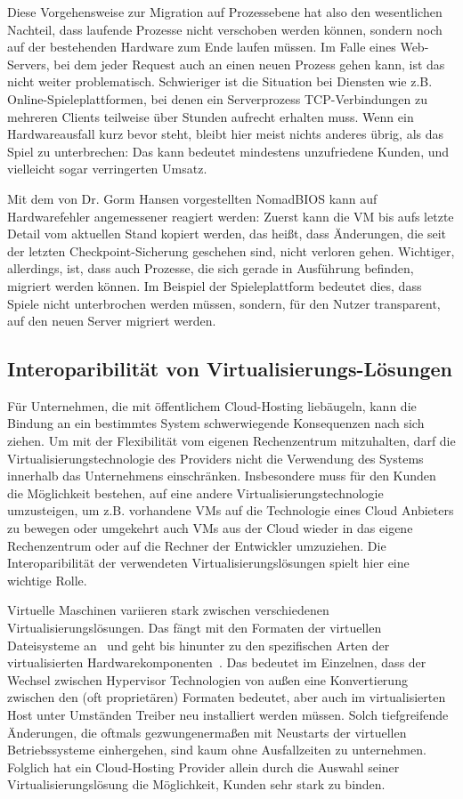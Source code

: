 Diese Vorgehensweise zur Migration auf Prozessebene hat also den
wesentlichen Nachteil, dass laufende Prozesse nicht verschoben werden
können, sondern noch auf der bestehenden Hardware zum Ende laufen
müssen. Im Falle eines Web-Servers, bei dem jeder Request auch an
einen neuen Prozess gehen kann, ist das nicht weiter
problematisch. Schwieriger ist die Situation bei Diensten wie
z.B. Online-Spieleplattformen, bei denen ein Serverprozess
TCP-Verbindungen zu mehreren Clients teilweise über Stunden aufrecht
erhalten muss. Wenn ein Hardwareausfall kurz bevor steht, bleibt hier
meist nichts anderes übrig, als das Spiel zu unterbrechen: Das kann
bedeutet mindestens unzufriedene Kunden, und vielleicht sogar
verringerten Umsatz.

Mit dem von Dr. Gorm Hansen vorgestellten NomadBIOS kann auf Hardwarefehler
angemessener reagiert werden: Zuerst kann die VM bis aufs letzte
Detail vom aktuellen Stand kopiert werden, das heißt, dass Änderungen,
die seit der letzten Checkpoint-Sicherung geschehen sind, nicht
verloren gehen. Wichtiger, allerdings, ist, dass auch Prozesse, die
sich gerade in Ausführung befinden, migriert werden können. Im
Beispiel der Spieleplattform bedeutet dies, dass Spiele nicht
unterbrochen werden müssen, sondern, für den Nutzer transparent, auf
den neuen Server migriert werden.

\subsection{Interoparibilität von Virtualisierungs-Lösungen}
Für Unternehmen, die mit öffentlichem Cloud-Hosting liebäugeln, kann
die Bindung an ein bestimmtes System schwerwiegende Konsequenzen nach
sich ziehen. Um mit der Flexibilität vom eigenen Rechenzentrum
mitzuhalten, darf die Virtualisierungstechnologie des Providers nicht
die Verwendung des Systems innerhalb das Unternehmens
einschränken. Insbesondere muss für den Kunden die Möglichkeit
bestehen, auf eine andere Virtualisierungstechnologie umzusteigen, um
z.B. vorhandene VMs auf die Technologie eines Cloud Anbieters zu
bewegen oder umgekehrt auch VMs aus der Cloud wieder in das eigene
Rechenzentrum oder auf die Rechner der Entwickler umzuziehen. Die
Interoparibilität der verwendeten Virtualisierungslösungen spielt hier
eine wichtige Rolle.

Virtuelle Maschinen variieren stark zwischen verschiedenen
Virtualisierungslösungen. Das fängt mit den Formaten der virtuellen
Dateisysteme an~\cite{none} und geht bis hinunter zu den spezifischen
Arten der virtualisierten Hardwarekomponenten~\cite{none}. Das
bedeutet im Einzelnen, dass der Wechsel zwischen Hypervisor
Technologien von außen eine Konvertierung zwischen den (oft
proprietären) Formaten bedeutet, aber auch im virtualisierten Host
unter Umständen Treiber neu installiert werden müssen. Solch
tiefgreifende Änderungen, die oftmals gezwungenermaßen mit Neustarts
der virtuellen Betriebssysteme einhergehen, sind kaum ohne
Ausfallzeiten zu unternehmen. Folglich hat ein Cloud-Hosting Provider
allein durch die Auswahl seiner Virtualisierungslösung die
Möglichkeit, Kunden sehr stark zu binden.

